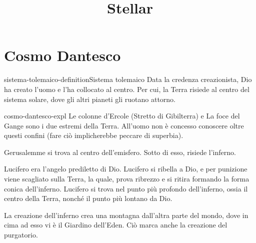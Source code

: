\documentclass[preview]{standalone}
\begin{document}
\title{Stellar}
\genpage

\section{Cosmo Dantesco}

\begin{snippetdefinition}{sistema-tolemaico-definition}{Sistema tolemaico}
    Data la credenza creazionista, Dio ha creato l'uomo e l'ha collocato al centro.
    Per cui, la Terra risiede al centro del sistema solare, dove gli altri pianeti gli ruotano attorno.
\end{snippetdefinition}

\begin{snippet}{cosmo-dantesco-expl}
    Le colonne d'Ercole (Stretto di Gibilterra) e La foce del Gange
    sono i due estremi della Terra. All'uomo non è concesso conoscere oltre questi confini
    (fare ciò implicherebbe peccare di superbia).
    
    Gerusalemme si trova al centro dell'emisfero. Sotto di esso, risiede l'inferno.
    
    Lucifero era l'angelo prediletto di Dio.
    Lucifero si ribella a Dio, e per punizione viene scagliato sulla Terra, la quale,
    prova ribrezzo e si ritira formando la forma conica dell'inferno. Lucifero si trova nel punto
    più profondo dell'inferno, ossia il centro della Terra, nonché il punto più lontano da Dio.
    
    La creazione dell'inferno crea una montagna dall'altra parte del mondo, dove in cima ad esso
    vi è il Giardino dell'Eden. Ciò marca anche la creazione del purgatorio.
\end{snippet}

\end{document}
